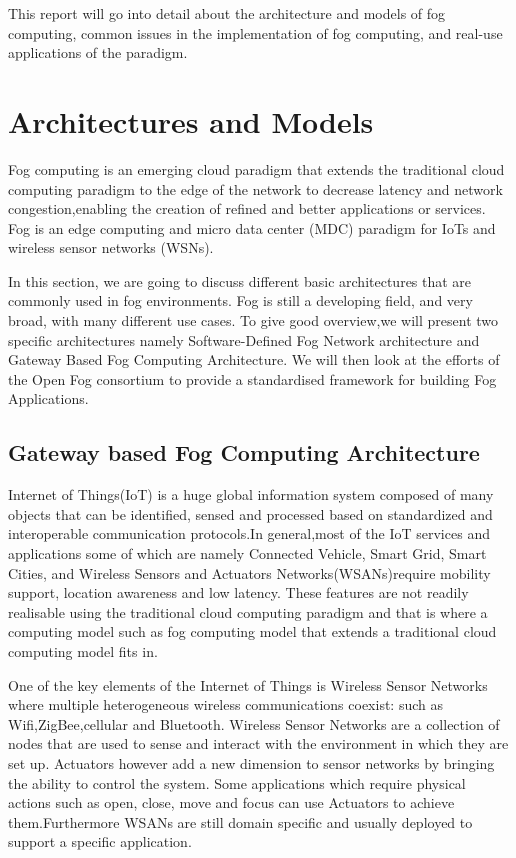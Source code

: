 \documentclass{article}
\begin{document}
This report will go into detail about the architecture and models of fog computing, common issues in the implementation of fog computing, and real-use applications of the paradigm.

\section{Architectures and Models}
Fog computing is an emerging cloud paradigm that extends the traditional cloud computing paradigm to the edge of the network to decrease latency and network congestion,enabling the creation of refined and better applications or services. Fog is an edge computing and micro data center (MDC) paradigm for IoTs and wireless sensor networks (WSNs).

In this section, we are going to discuss different basic architectures that are commonly used in fog environments. Fog is still a developing field, and very broad, with many different use cases. To give good overview,we will present two specific architectures namely Software-Defined Fog Network architecture and Gateway Based Fog Computing Architecture.
We will then look at the efforts of the Open Fog consortium to provide a standardised framework for building Fog Applications.

\subsection{Gateway based Fog Computing Architecture}

Internet of Things(IoT) is a huge global information system composed of many objects that can be identified, sensed and processed based on standardized and interoperable
communication protocols\cite{lee2016gateway}.In general,most of the IoT services and applications some of which are namely Connected Vehicle, Smart Grid, Smart Cities, and Wireless Sensors and Actuators Networks(WSANs)require mobility support, location
awareness and low latency\cite{lee2016gateway}. These features are not readily realisable using the traditional cloud computing paradigm and that is where a computing model such as fog computing model that extends a traditional cloud computing model fits in.

One of the key elements of the Internet of Things is Wireless Sensor Networks where multiple heterogeneous wireless communications coexist: such as Wifi,ZigBee,cellular and Bluetooth. 
Wireless Sensor Networks are a collection of nodes that are used to sense and interact with the environment in which they are set up. Actuators however add a new dimension to sensor networks by bringing the ability to control the system. Some applications which require physical actions such as open, close, move and focus can use Actuators to achieve them.Furthermore WSANs are still domain specific and usually deployed to support a specific application\cite{lee2016gateway}.   
\end{document}
